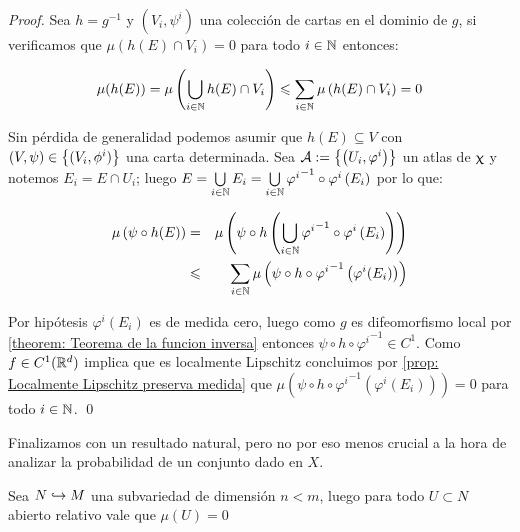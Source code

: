 \begin{proof}
	Sea $h = g^{-1}$ y $\left(V_i, \psi^i\right)$ una colecci\'on de cartas en el dominio de $g$, si verificamos que $\mu\left(h\left(E\right) \cap V_i\right) = 0$ para todo $i \in {\mathbb{N}}$ entonces:
	
	\begin{equation*}
	\mu(h(E)) = \mu \left(\bigcup\limits_{i \in {\mathbb{N}}}{h(E) \cap V_i}\right) \leqslant \sum\limits_{i \in {\mathbb{N}}}{\mu} \left(h(E) \cap V_i\right) = 0
	\end{equation*}
	
	Sin p\'erdida de generalidad podemos asumir que $h(E) \subseteq V$ con $(V, \psi) \in \left\lbrace(V_i, \phi^i)\right\rbrace$ una carta determinada. Sea $\mathcal{A} := \left\lbrace\left(U_i, \varphi^i \right)\right\rbrace$ un atlas de $\upchi$ y notemos $E_i = E \cap U_i$; luego $E = \bigcup\limits_{i \in {\mathbb{N}}}{E_i} = \bigcup\limits_{i \in {\mathbb{N}}}{{\varphi^i}^{-1} \circ \varphi^{i} \left(E_i\right)}$ por lo que:
	
	\begin{equation*}
	\begin{aligned}
	\mu\left(\psi \circ h(E)\right) & = & \mu \left(\psi \circ h \left(\bigcup\limits_{i \in {\mathbb{N}}}{{\varphi^i}^{-1} \circ \varphi^{i} \left(E_i\right)}\right)\right)\\
	& \leqslant & \sum\limits_{i \in {\mathbb{N}}}{\mu \left(\psi \circ h \circ {\varphi^{i}}^{-1} \left(\varphi^i (E_i)\right)\right)}
	\end{aligned}
	\end{equation*}
	
	Por hip\'otesis $\varphi^i(E_i)$ es de medida cero, luego como $g$ es difeomorfismo local por \ref{theorem: Teorema de la funcion inversa}  entonces $\psi \circ h \circ {\varphi^{i}}^{-1} \in C^1$. Como $f \in C^1({\mathbb{R}}^d)$ implica que es localmente Lipschitz concluimos por \ref{prop: Localmente Lipschitz preserva medida} que ${\mu \left(\psi \circ h \circ {\varphi^{i}}^{-1} \left(\varphi^i (E_i)\right)\right)} = 0$ para todo $i \in {\mathbb{N}}$. \qed
	
\end{proof}

Finalizamos con un resultado natural, pero no por eso menos crucial a la hora de analizar la probabilidad de un conjunto dado en $X$.

\begin{proposition}
	\label{prop: Dimension menor tiene medida 0}
	Sea $N \hookrightarrow M$ una subvariedad de dimensi\'on $n < m$, luego para todo $U \subset N$ abierto relativo vale que $\mu(U) = 0$
\end{proposition}

